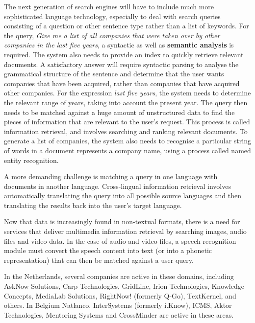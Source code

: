 \documentclass[]{../../metanetpaper}
\begin{document}
\begin{multicols}{2}

The next generation of search engines will have to include much more sophisticated language technology, especially to deal with search queries consisting of a question or other sentence type rather than a list of keywords. For the query, \textit{Give me a list of all companies that were taken over by other companies in the last five years}, a syntactic as well as \textbf{semantic analysis} is required. The system also needs to provide an index to quickly retrieve relevant documents. A satisfactory answer will require syntactic parsing to analyse the grammatical structure of the sentence and determine that the user wants companies that have been acquired, rather than companies that have acquired other companies. For the expression \textit{last five years}, the system needs to determine the relevant range of years, taking into account the present year. The query then needs to be matched against a huge amount of unstructured data to find the pieces of information that are relevant to the user’s request. This process is called information retrieval, and involves searching and ranking relevant documents. To generate a list of companies, the system also needs to recognise a particular string of words in a document represents a company name, using a process called named entity recognition.

A more demanding challenge is matching a query in one language with documents in another language. Cross-lingual information retrieval involves automatically translating the query into all possible source languages and then translating the results back into the user's target language.

Now that data is increasingly found in non-textual formats, there is a need for services that deliver multimedia information retrieval by searching images, audio files and video data. In the case of audio and video files, a speech recognition module must convert the speech content into text (or into a phonetic representation) that can then be matched against a user query.

 In the Netherlands, several companies are active in these domains, including AskNow Solutions, Carp Technologies, GridLine, Irion Technologies, Knowledge Concepts, MediaLab Solutions, RightNow! (formerly Q-Go), TextKernel, and others. In Belgium Natlanco, InterSystems (formerly i.Know), ICMS, Aktor Technologies, Mentoring Systems and CrossMinder are active in these areas.


\end{multicols}
\end{document}

